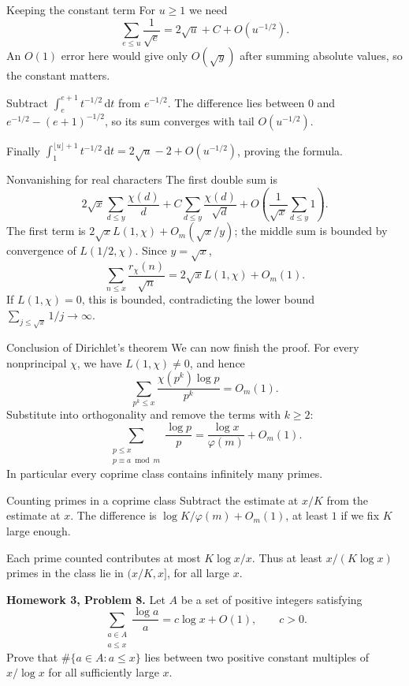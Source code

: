 \documentclass[aspectratio=169,11pt]{beamer}
\newcommand{\dd}{\,\mathrm d}
\newcommand{\HW}[2]{{\color{teal}\textbf{Homework #1, Problem #2.}}}
\begin{document}
\begin{frame}{Keeping the constant term}
For $u\ge1$ we need
\[\sum_{e\le u}\frac1{\sqrt e}=2\sqrt u+C+O(u^{-1/2}).\]
An $O(1)$ error here would give only $O(\sqrt y)$ after summing absolute values, so the constant matters.

Subtract $\int_e^{e+1}t^{-1/2}\dd t$ from $e^{-1/2}$. The difference lies between $0$ and $e^{-1/2}-(e+1)^{-1/2}$, so its sum converges with tail $O(u^{-1/2})$.

Finally $\int_1^{\lfloor u\rfloor+1}t^{-1/2}\dd t=2\sqrt u-2+O(u^{-1/2})$, proving the formula.
\end{frame}
\begin{frame}{Nonvanishing for real characters}
The first double sum is
\[2\sqrt x\sum_{d\le y}\frac{\chi(d)}d+C\sum_{d\le y}\frac{\chi(d)}{\sqrt d}
+O\left(\frac1{\sqrt x}\sum_{d\le y}1\right).\]
The first term is $2\sqrt xL(1,\chi)+O_m(\sqrt x/y)$; the middle sum is bounded by convergence of $L(1/2,\chi)$. Since $y=\sqrt x$,
\[\sum_{n\le x}\frac{r_\chi(n)}{\sqrt n}=2\sqrt xL(1,\chi)+O_m(1).\]
If $L(1,\chi)=0$, this is bounded, contradicting the lower bound $\sum_{j\le\sqrt x}1/j\to\infty$.
\end{frame}
\begin{frame}{Conclusion of Dirichlet's theorem}
We can now finish the proof. For every nonprincipal $\chi$, we have $L(1,\chi)\ne0$, and hence
\[\sum_{p^k\le x}\frac{\chi(p^k)\log p}{p^k}=O_m(1).\]
Substitute into orthogonality and remove the terms with $k\ge2$:
\[\boxed{\displaystyle\sum_{\substack{p\le x\\p\equiv a\bmod m}}\frac{\log p}{p}=\frac{\log x}{\varphi(m)}+O_m(1).}\]
In particular every coprime class contains infinitely many primes.
\end{frame}
\begin{frame}{Counting primes in a coprime class}
Subtract the estimate at $x/K$ from the estimate at $x$. The difference is $\log K/\varphi(m)+O_m(1)$, at least $1$ if we fix $K$ large enough.

Each prime counted contributes at most $K\log x/x$. Thus at least $x/(K\log x)$ primes in the class lie in $(x/K,x]$, for all large $x$.

\HW{3}{8} Let $A$ be a set of positive integers satisfying
\[\sum_{\substack{a\in A\\a\le x}}\frac{\log a}{a}=c\log x+O(1),\qquad c>0.\]
Prove that $\#\{a\in A:a\le x\}$ lies between two positive constant multiples of $x/\log x$ for all sufficiently large $x$.
\end{frame}
\end{document}
